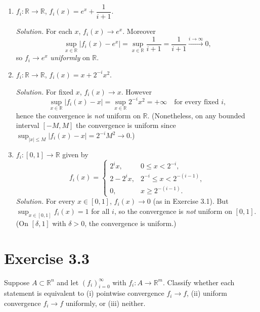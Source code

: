 \documentclass[11pt,a4paper]{article}
\begin{document}
\begin{enumerate}
\renewcommand\labelenumi{(\alph{enumi})}

\item $f_i:\mathbb{R}\to\mathbb{R}$, \; $f_i(x)=e^{x}+\dfrac{1}{i+1}$.

\textit{Solution.} For each $x$, $f_i(x)\to e^x$. Moreover
\[
\sup_{x\in\mathbb{R}} |f_i(x)-e^x|=\sup_{x\in\mathbb{R}}\frac{1}{i+1}=\frac{1}{i+1}\xrightarrow{i\to\infty}0,
\]
so $f_i\to e^x$ \emph{uniformly} on $\mathbb{R}$.

\item $f_i:\mathbb{R}\to\mathbb{R}$, \; $f_i(x)=x+2^{-i}x^2$.

\textit{Solution.} For fixed $x$, $f_i(x)\to x$. However
\[
\sup_{x\in\mathbb{R}} |f_i(x)-x|=\sup_{x\in\mathbb{R}} 2^{-i}x^2=+\infty \quad \text{for every fixed } i,
\]
hence the convergence is \emph{not} uniform on $\mathbb{R}$.
(Nonetheless, on any bounded interval $[-M,M]$ the convergence is uniform since
$\sup_{|x|\le M} |f_i(x)-x|=2^{-i}M^2\to 0$.)

\item $f_i:[0,1]\to\mathbb{R}$ given by
\[
f_i(x)=
\begin{cases}
2^i x, & 0\le x<2^{-i},\\[2pt]
2-2^i x, & 2^{-i}\le x<2^{-(i-1)},\\[2pt]
0, & x\ge 2^{-(i-1)}.
\end{cases}
\]
\textit{Solution.} For every $x\in[0,1]$, $f_i(x)\to 0$ (as in Exercise 3.1). But
$\sup_{x\in[0,1]} f_i(x)=1$ for all $i$, so the convergence is \emph{not} uniform on $[0,1]$.
(On $[\delta,1]$ with $\delta>0$, the convergence is uniform.)
\end{enumerate}

\section*{Exercise 3.3}
Suppose $A\subset\mathbb{R}^n$ and let $(f_i)_{i=0}^\infty$ with $f_i:A\to\mathbb{R}^m$.
Classify whether each statement is equivalent to (i) pointwise convergence $f_i\to f$,
(ii) uniform convergence $f_i\to f$ uniformly, or (iii) neither.
\end{document}
